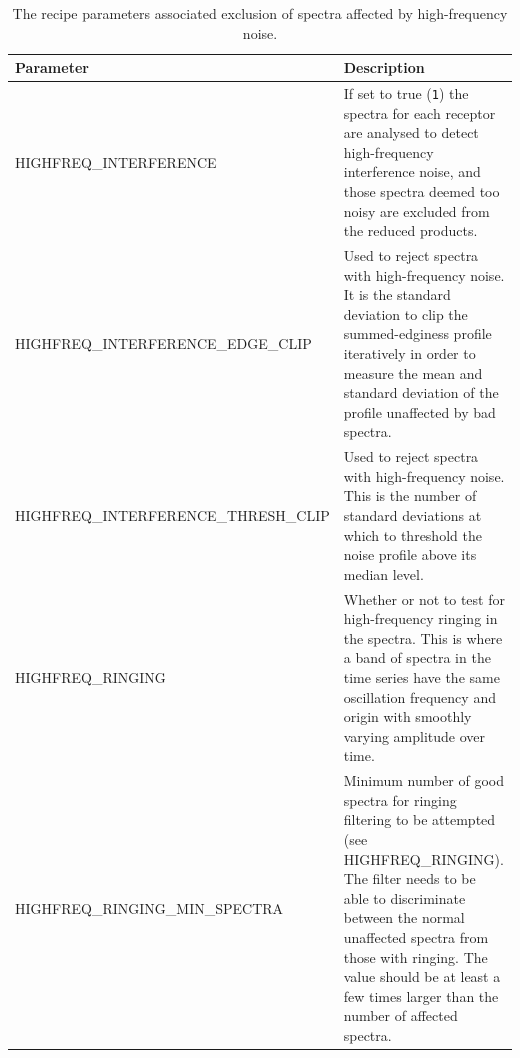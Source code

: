 \documentclass[11pt,oneside,chapters]{starlink}
\begin{document}
\begin{table}[h!]
\begin{small}
\begin{tabular}{|p{6.8cm}|p{8.6cm}|}
\hline
\textbf{Parameter} & \textbf{Description} \\
\hline
HIGHFREQ\_INTERFERENCE & If set to true (\texttt{1}) the spectra for each receptor are analysed to
                         detect high-frequency interference noise, and those spectra deemed
                         too noisy are excluded from the reduced products.\\
HIGHFREQ\_INTERFERENCE\_EDGE\_CLIP & Used to reject spectra with high-frequency noise.  It
                                     is the standard deviation to clip the summed-edginess
                                     profile iteratively in order to measure the mean and
                                     standard deviation of the profile unaffected by bad
                                     spectra.\\
HIGHFREQ\_INTERFERENCE\_THRESH\_CLIP & Used to reject spectra with high-frequency noise.
                                       This is the number of standard deviations at which
                                       to threshold the noise profile above its median level.\\
HIGHFREQ\_RINGING & Whether or not to test for high-frequency ringing in the spectra. This
                    is where a band of spectra in the time series have the same oscillation
                    frequency and origin with smoothly varying amplitude over time.\\
HIGHFREQ\_RINGING\_MIN\_SPECTRA & Minimum number of good spectra for ringing filtering to
                                  be attempted (see HIGHFREQ\_RINGING).  The filter needs
                                  to be able to discriminate between the normal unaffected
                                  spectra from those with ringing.  The value should be at
                                  least a few times larger than the number of affected
                                  spectra.\\
\hline
\end{tabular}
\end{small}
\caption{\label{tab:hfi_params}
  The recipe parameters associated exclusion of spectra affected by high-frequency
  noise.}
\end{table}
\end{document}
